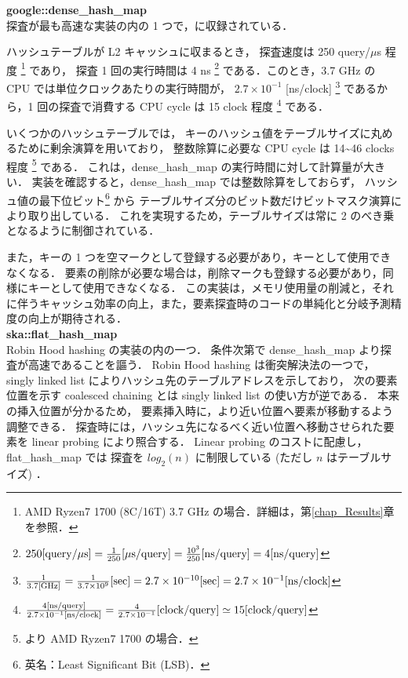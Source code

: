 {\bf google::dense\_hash\_map}
\samepage \\ \indent
探査が最も高速な実装の内の 1 つで，\cite{sparsehash2005}に収録されている．

ハッシュテーブルが L2 キャッシュに収まるとき，
探査速度は 250 query/$\mu$s 程度 \footnote{AMD Ryzen7 1700 (8C/16T) 3.7 GHz の場合．詳細は，第\ref{chap_Results}章を参照．} であり，
探査 1 回の実行時間は 4 ns
\footnote{
  $
    250{\rm [query \slash \mu s]}
    = \frac{1}{250} {\rm [\mu s \slash query]}
    = \frac{10^3}{250} {\rm [ns \slash query]}
    = 4 {\rm [ns \slash query]}
  $
}
である．このとき，3.7 GHz の CPU では単位クロックあたりの実行時間が，
$2.7 \times 10^{-1}$ [ns/clock]
\footnote{
  $
    \frac{1}{3.7 {\rm [GHz]}}
    = \frac{1}{3.7 \times 10^9}{\rm [sec]}
    = 2.7 \times 10^{-10}{\rm [sec]}
    = 2.7 \times 10^{-1}{\rm [ns/clock]}
  $
}
であるから，1 回の探査で消費する CPU cycle は
15 clock 程度 \footnote
{
  $
    \frac{ 4 {\rm [ns/query]} }{ 2.7 \times 10^{-1} {\rm [ns/clock]} }
    = \frac{ 4 }{ 2.7 \times 10^{-1} } {\rm [clock/query]}
    \simeq 15 {\rm [clock/query]}
  $
} である．

いくつかのハッシュテーブルでは，
キーのハッシュ値をテーブルサイズに丸めるために剰余演算を用いており，
整数除算に必要な CPU cycle は 14\textasciitilde 46 clocks 程度
\footnote{
  \cite{AgnerFog2018}より AMD Ryzen7 1700 の場合．
}
である．
これは，dense\_hash\_map の実行時間に対して計算量が大きい．
実装を確認すると，dense\_hash\_map では整数除算をしておらず，
ハッシュ値の最下位ビット\footnote{英名：Least Significant Bit (LSB)．} から
テーブルサイズ分のビット数だけビットマスク演算により取り出している．
これを実現するため，テーブルサイズは常に 2 のべき乗となるように制御されている．

また，キーの 1 つを空マークとして登録する必要があり，キーとして使用できなくなる．
要素の削除が必要な場合は，削除マークも登録する必要があり，同様にキーとして使用できなくなる．
この実装は，メモリ使用量の削減と，それに伴うキャッシュ効率の向上，また，要素探査時のコードの単純化と分岐予測精度の向上が期待される．
\\

{\bf ska::flat\_hash\_map}
\samepage \\ \indent
Robin Hood hashing の実装の内の一つ．
条件次第で dense\_hash\_map より探査が高速であることを謳う．
Robin Hood hashing は衝突解決法の一つで，
singly linked list によりハッシュ先のテーブルアドレスを示しており，
次の要素位置を示す coalesced chaining とは singly linked list の使い方が逆である．
本来の挿入位置が分かるため，
要素挿入時に，より近い位置へ要素が移動するよう調整できる．
探査時には，ハッシュ先になるべく近い位置へ移動させられた要素を linear probing により照合する．
Linear probing のコストに配慮し，flat\_hash\_map では
探査を $log_2(n)$ に制限している (ただし $n$ はテーブルサイズ) \citep{Skarupke2017}．

